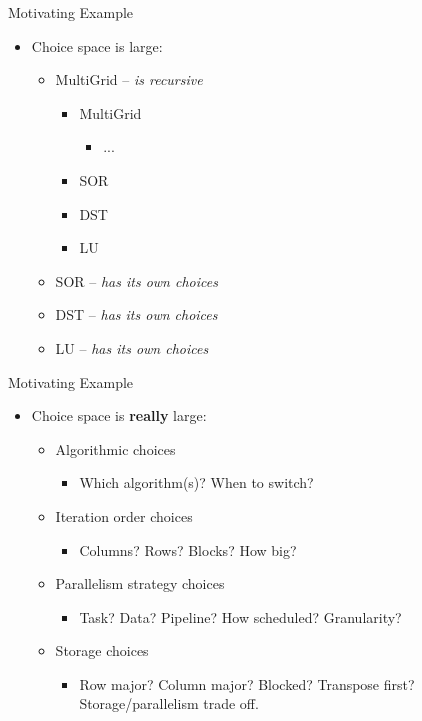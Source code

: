 \documentclass[pdf,blends]{prosper}
\begin{document}
\begin{slide}{Motivating Example}
\begin{itemize}
\item Choice space is large:
  \begin{itemize}
  \item MultiGrid -- {\em is recursive}
    \begin{itemize}
    \item MultiGrid
      \begin{itemize}
      \item ...
      \end{itemize}
    \item SOR
    \item DST
    \item LU
    \end{itemize}
  \item SOR -- {\em has its own choices}
  \item DST -- {\em has its own choices}
  \item LU  -- {\em has its own choices}
  \end{itemize}
\end{itemize}
\end{slide}


\begin{slide}{Motivating Example}
\begin{itemize}
\item Choice space is {\bf really} large:
  \begin{itemize}
  \item Algorithmic choices
    \begin{itemize}
    \item \small Which algorithm(s)? When to switch?
    \end{itemize}
  \item Iteration order choices
    \begin{itemize}
    \item\small
      Columns? Rows? Blocks? How big?
    \end{itemize}
  \item Parallelism strategy choices
    \begin{itemize}
    \item\small
    Task? Data? Pipeline? How scheduled? Granularity?
    \end{itemize}
  \item Storage choices 
   \begin{itemize}
    \item\small
    Row major? Column major? Blocked? Transpose first? Storage/parallelism trade off.
    \end{itemize}
  \end{itemize}
\end{itemize}
\end{slide}
\end{document}
